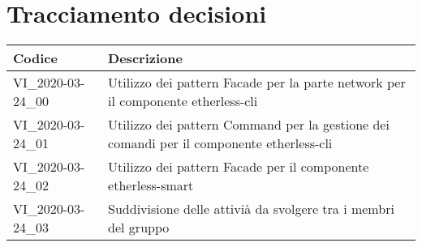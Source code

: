 \section{Tracciamento decisioni}
\renewcommand{\arraystretch}{1.8}

\begin{longtable}{|p{5cm}|p{8cm}|}
	\hline
	
	\rowcolor{header}
	\textbf{Codice} & \textbf{Descrizione} \\
	
	\hline
	
	VI\_2020-03-24\_00 & Utilizzo dei pattern Facade per la parte network per il componente etherless-cli\\ 
	VI\_2020-03-24\_01 & Utilizzo dei pattern Command per la gestione dei comandi per il componente etherless-cli\\ 
	VI\_2020-03-24\_02 & Utilizzo dei pattern Facade per il componente etherless-smart\\
	VI\_2020-03-24\_03 & Suddivisione delle attivià da svolgere tra i membri del gruppo \\
	\hline
\end{longtable}
